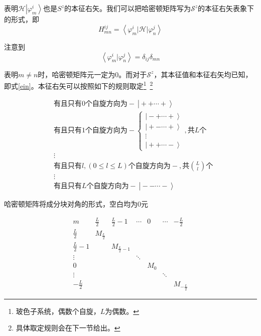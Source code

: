 \documentclass[UTF8,12pt]{article}
\providecommand\Ket[1]{\left|\right. #1 \left.\right\rangle}
\providecommand\Bracket[2]{\left\langle #1 \big| #2 \right\rangle}
\providecommand\BraCket[3]{\left\langle #1 \big| #2 \big| #3 \right\rangle}
\numberwithin{equation}{subsection}
\begin{document}
	表明$\mathcal H\Ket{\varphi^i_m}$也是$S^z$的本征右矢。我们可以把哈密顿矩阵写为$\mathcal S^z$的本征右矢表象下的形式，即$$H^{ij}_{mn}=\BraCket{\varphi^i_m}{\mathcal H}{\varphi^j_n}$$
	
	注意到$$\Bracket{\varphi^i_m}{\varphi^j_n}=\delta_{ij}\delta_{mn}$$
	
	表明$m\not=n$时，哈密顿矩阵元一定为$0$。而对于$\mathcal S^z$，其本征值和本征右矢均已知，即式\ref{ein}。本征右矢可以按照如下的规则取定\footnote{玻色子系统，偶数个自旋，$L$为偶数。}~\footnote{具体取定规则会在下一节给出。}
	\begin{snugshade}
		\begin{equation*}
			\begin{aligned}
				&\text{有且只有$0$个自旋方向为$-$}~\Ket{++\cdots+}\\
				&\text{有且只有$1$个自旋方向为$-$}\begin{cases}
					\Ket{-+\cdots+}\\
					\Ket{+-\cdots+}\\
					\vdots\\
					\Ket{++\cdots-}
				\end{cases},\text{共$L$个}\\
				&\vdots\\
				&\text{有且只有$l,(0\leq l\leq L)$个自旋方向为$-$},\text{共$\binom{L}{l}$个}\\
				&\vdots\\
				&\text{有且只有$L$个自旋方向为$-$}~\Ket{--\cdots-}
			\end{aligned}
		\end{equation*}
	\end{snugshade}
	
	哈密顿矩阵将成分块对角的形式，空白均为0元
	\begin{snugshade}
	\begin{equation}
		\begin{array}{c|c|c|c|c|c|c}
			m&\frac{L}{2}&\frac{L}{2}-1&\cdots&0&\cdots&-\frac{L}{2}\\
			\hline
			\frac{L}{2}&M_{\frac{L}{2}}&&&&&\\
			\hline
			\frac{L}{2}-1&&M_{\frac{L}{2}-1}&&&&\\
			\hline
			\vdots&&&\ddots&&&\\
			\hline
			0&&&&M_0&&\\
			\hline
			\vdots&&&&&\ddots&\\
			\hline
			-\frac{L}{2}&&&&&&M_{-\frac{L}{2}}
		\end{array}
		\label{blocks}
	\end{equation}
	\end{snugshade}
\end{document}
